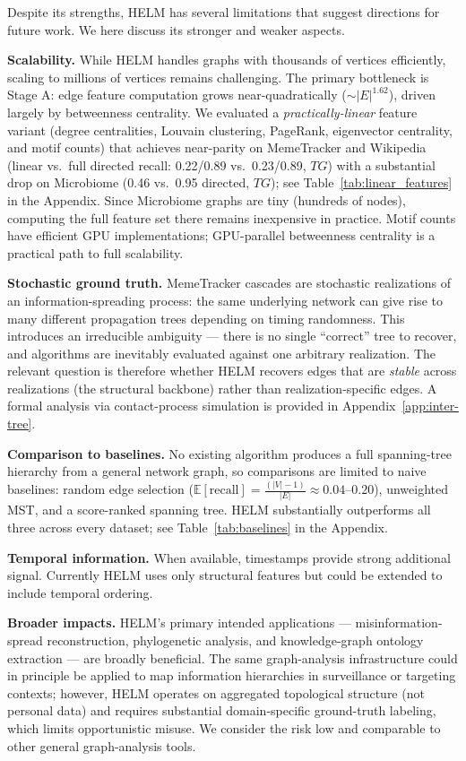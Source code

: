 \documentclass{article}
\begin{document}
    Despite its strengths, HELM has several limitations that suggest directions for future work. We here discuss its stronger and weaker aspects.

    \textbf{Scalability.} While HELM handles graphs with thousands of vertices efficiently, scaling to millions of vertices remains challenging. The primary bottleneck is Stage A: edge feature computation grows near-quadratically ($\sim|E|^{1.62}$), driven largely by betweenness centrality. We evaluated a \emph{practically-linear} feature variant (degree centralities, Louvain clustering, PageRank, eigenvector centrality, and motif counts) that achieves near-parity on MemeTracker and Wikipedia (linear vs.\ full directed recall: 0.22/0.89 vs.\ 0.23/0.89, $TG$) with a substantial drop on Microbiome (0.46 vs.\ 0.95 directed, $TG$); see Table~\ref{tab:linear_features} in the Appendix. Since Microbiome graphs are tiny (hundreds of nodes), computing the full feature set there remains inexpensive in practice. Motif counts have efficient GPU implementations; GPU-parallel betweenness centrality is a practical path to full scalability.

    \textbf{Stochastic ground truth.} MemeTracker cascades are stochastic realizations of an information-spreading process: the same underlying network can give rise to many different propagation trees depending on timing randomness. This introduces an irreducible ambiguity — there is no single ``correct'' tree to recover, and algorithms are inevitably evaluated against one arbitrary realization. The relevant question is therefore whether HELM recovers edges that are \emph{stable} across realizations (the structural backbone) rather than realization-specific edges. A formal analysis via contact-process simulation is provided in Appendix~\ref{app:inter-tree}.

    \textbf{Comparison to baselines.} No existing algorithm produces a full spanning-tree hierarchy from a general network graph, so comparisons are limited to naive baselines: random edge selection ($\mathbb{E}[\text{recall}] = \frac{(|V|-1)}{|E|} \approx 0.04$--$0.20$), unweighted MST, and a score-ranked spanning tree. HELM substantially outperforms all three across every dataset; see Table~\ref{tab:baselines} in the Appendix.

    \textbf{Temporal information.} When available, timestamps provide strong additional signal. Currently HELM uses only structural features but could be extended to include temporal ordering.

    \textbf{Broader impacts.} HELM's primary intended applications --- misinformation-spread reconstruction, phylogenetic analysis, and knowledge-graph ontology extraction --- are broadly beneficial. The same graph-analysis infrastructure could in principle be applied to map information hierarchies in surveillance or targeting contexts; however, HELM operates on aggregated topological structure (not personal data) and requires substantial domain-specific ground-truth labeling, which limits opportunistic misuse. We consider the risk low and comparable to other general graph-analysis tools.
\end{document}
